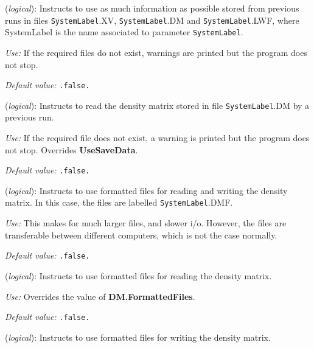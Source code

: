 \documentclass[11pt]{article}
\begin{document}
\begin{description}
\itemsep 10pt
\parsep 0pt


\item[{\bf UseSaveData}] ({\it logical}): 
Instructs to use as much information as possible stored from
previous runs in files {\tt SystemLabel}.XV, {\tt SystemLabel}.DM and
{\tt SystemLabel}.LWF, where SystemLabel is the name associated
to parameter {\tt SystemLabel}.

{\it Use:} If the required files do not exist, warnings are
printed but the program does not stop.

{\it Default value:} {\tt .false.}


\item[{\bf DM.UseSaveDM}] ({\it logical}): 
Instructs to read the density matrix stored in file
{\tt SystemLabel}.DM by a previous run.

{\it Use:} If the required file does not exist, a warning is
printed but the program does not stop. Overrides {\bf UseSaveData}.

{\it Default value:} {\tt .false.}


\item[{\bf DM.FormattedFiles}] ({\it logical}): 
Instructs to use formatted files for reading and writing
the density matrix. In this case, the files are labelled
{\tt SystemLabel}.DMF.

{\it Use:} This makes for much larger files, and slower i/o. However, the
files are transferable between different computers, which is
not the case normally.

{\it Default value:} {\tt .false.}


\item[{\bf DM.FormattedInput}] ({\it logical}): 
Instructs to use formatted files for reading the density
matrix.

{\it Use:} Overrides the value of {\bf DM.FormattedFiles}.

{\it Default value:} {\tt .false.}


\item[{\bf DM.FormattedOutput}] ({\it logical}): 
Instructs to use formatted files for writing the density
matrix.


\end{description}
\end{document}

